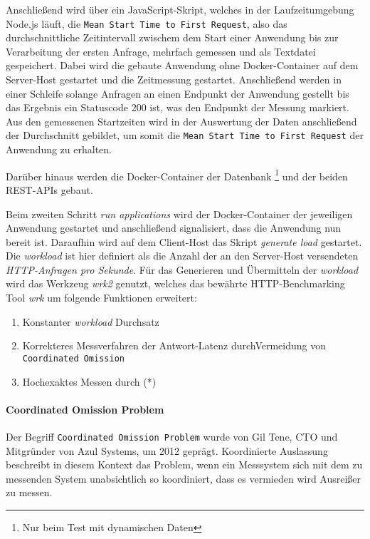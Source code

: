 Anschließend wird über ein JavaScript-Skript, welches in der Laufzeitumgebung Node.js läuft,
die \verb|Mean Start Time to First Request|, also das durchschnittliche Zeitintervall zwischem dem Start einer Anwendung bis
zur Verarbeitung der ersten Anfrage, mehrfach gemessen und als Textdatei gespeichert.
Dabei wird die gebaute Anwendung ohne Docker-Container auf dem Server-Host gestartet und die Zeitmessung gestartet. Anschließend werden in einer Schleife
solange Anfragen an einen Endpunkt der Anwendung gestellt bis das Ergebnis ein Statuscode 200 ist, was den Endpunkt der Messung markiert.
Aus den gemessenen Startzeiten wird in der Auswertung der Daten anschließend der Durchschnitt gebildet, um somit die \verb|Mean Start Time to First Request|
der Anwendung zu erhalten.

Darüber hinaus werden die Docker-Container der Datenbank
\footnote{Nur beim Test mit dynamischen Daten} und der beiden REST-APIs gebaut.

Beim zweiten Schritt \textit{run applications} wird der Docker-Container der jeweiligen Anwendung gestartet und anschließend signalisiert,
dass die Anwendung nun bereit ist.
Daraufhin wird auf dem Client-Host das Skript \textit{generate load} gestartet.
Die \textit{workload} ist hier definiert als die Anzahl der an den Server-Host versendeten \textit{HTTP-Anfragen pro Sekunde}.
Für das Generieren und Übermitteln der \textit{workload} wird das Werkzeug \textit{wrk2} genutzt, welches das
bewährte HTTP-Benchmarking Tool \textit{wrk} um folgende Funktionen erweitert:\parencite{Wrk2, Wrk}
\begin{enumerate}
  \item Konstanter \textit{workload} Durchsatz
  \item Korrekteres Messverfahren der Antwort-Latenz durch\linebreak Vermeidung von \verb|Coordinated Omission|
  \item Hochexaktes Messen durch (*)
\end{enumerate}

\paragraph{Coordinated Omission Problem}
Der Begriff \verb|Coordinated Omission Problem| wurde von Gil Tene, CTO und Mitgründer von Azul Systems, um 2012 geprägt.
Koordinierte Auslassung beschreibt in diesem Kontext das Problem, wenn ein Messsystem sich mit dem zu messenden System unabsichtlich so koordiniert,
dass es vermieden wird Ausreißer zu messen.

